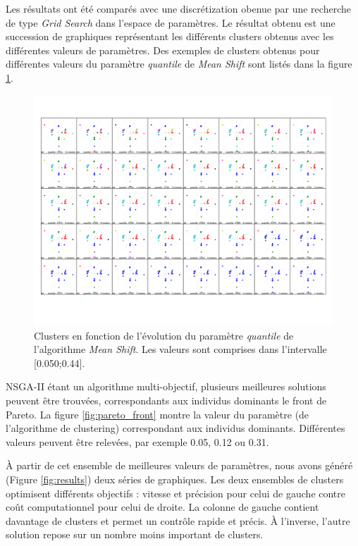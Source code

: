 \documentclass[draft]{llncs}
\begin{document}
Les résultats ont été comparés avec une discrétization obenue par une recherche de type \textit{Grid Search} dans l'espace de paramètres.
Le résultat obtenu est une succession de graphiques représentant les différents clusters obtenus avec les différentes valeurs de paramètres.
Des exemples de clusters obtenus pour différentes valeurs du paramètre \textit{quantile} de \textit{Mean Shift} sont listés dans la figure \ref{fig:validation}.

\begin{figure}[ht]
  \begin{center}
  \includegraphics[width=\textwidth]{figures/DS2_MS.pdf}
    \caption{Clusters en fonction de l'évolution du paramètre \textit{quantile} de l'algorithme \textit{Mean Shift}. Les valeurs sont comprises dans l'intervalle [0.050;0.44].}
  \label{fig:validation}
  \end{center}
\end{figure}

NSGA-II étant un algorithme multi-objectif, plusieurs meilleures solutions peuvent être trouvées, correspondants aux individus dominants le front de Pareto.
La figure \ref{fig:pareto_front} montre la valeur du paramètre (de l'algorithme de clustering) correspondant aux individus dominants.
Différentes valeurs peuvent être relevées, par exemple 0.05, 0.12 ou 0.31.

\`A partir de cet ensemble de meilleures valeurs de paramètres, nous avons généré (Figure \ref{fig:results}) deux séries de graphiques.
Les deux ensembles de clusters optimisent différents objectifs : vitesse et précision pour celui de gauche contre coût computationnel pour celui de droite. La colonne de gauche contient davantage de clusters et permet un contrôle rapide et précis.
\`A l'inverse, l'autre solution repose sur un nombre moins important de clusters.
\end{document}
